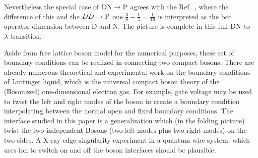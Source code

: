 Nevertheless the special case of ${\rm DN} \rightarrow {\rm P}$ agrees with the Ref.~, where the difference of this and the $DD \rightarrow {\rm P}$ one  $\frac{3}{8}- \frac{1}{4} = \frac{1}{16} $ is interpreted as the bcc operator dimension between D and N. The picture is complete in this full ${\rm DN}$ to $\lambda $ transition. 


Aside from free lattice boson model for the numerical purposes, these set of boundary conditions can be realized in connecting two compact bosons. There are already numerous theoretical and experimental work on the boundary conditions of Luttinger liquid\cite{schmeltzer_zero_1999,anfuso_luttinger_2003,voit_bounded_2000,fabrizio_interacting_1995,egger_applying_1998}, which is the universal compact boson theory of the (Bosonized) one-dimensional electron gas\cite{giamarchi_quantum_2015}. For example, gate voltage \cite{egger_applying_1998} may be used to twist the left and right modes of the boson to create a boundary condition interpolating between the normal open and fixed boundary conditions. The interface studied in this paper is a generalization which (in the folding picture) twist the two independent Bosons (two left modes plus two right modes) on the two sides. A X-ray edge singularity experiment in a quantum wire system, which uses ion to switch on and off the boson interfaces should be plausible. 


